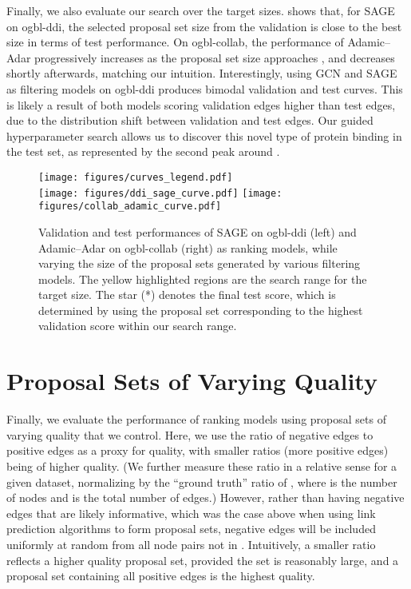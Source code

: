 \documentclass{article}
\begin{document}
Finally, we also evaluate our search over the target sizes.
 shows that, for SAGE on ogbl-ddi, the selected proposal set size from the validation is close to the best size in terms of test performance.
On ogbl-collab, the performance of Adamic--Adar progressively increases as the proposal set size approaches , and decreases shortly afterwards, matching our intuition. 
Interestingly, using GCN and SAGE as filtering models on ogbl-ddi produces bimodal validation and test curves. 
This is likely a result of both models scoring validation edges higher than test edges, 
due to the distribution shift between validation and test edges. 
Our guided hyperparameter search allows us to discover this novel type of protein binding in the test set, 
as represented by the second peak around .

\begin{figure}[t]
    \centering
    \texttt{[image: figures/curves\_legend.pdf]} \\
    \texttt{[image: figures/ddi\_sage\_curve.pdf]}
    \texttt{[image: figures/collab\_adamic\_curve.pdf]}
   \vspace{-0.5\baselineskip}
    \caption{Validation and test performances of SAGE on ogbl-ddi (left) and Adamic--Adar on ogbl-collab (right) as ranking models, while varying the size of the proposal sets generated by various filtering models. 
   The yellow highlighted regions are the search range for the target size.
    The star (*) denotes the final test score, which is determined by using the proposal set corresponding to the highest validation score within our search range.}
    \label{fig:curve}
\end{figure}



\section{Proposal Sets of Varying Quality}\label{ratioquality}

Finally, we evaluate the performance of ranking models using proposal sets of varying quality that we control.
Here, we use the ratio of negative edges to positive edges as a proxy for quality,
with smaller ratios (more positive edges) being of higher quality.
(We further measure these ratio in a relative sense for a given dataset, normalizing by the ``ground truth'' ratio of , where
 is the number of nodes and  is the total number of edges.)
However, rather than having negative edges that are likely informative, 
which was the case above when using link prediction algorithms to form proposal sets,
negative edges will be included uniformly at random from all node pairs not in .
Intuitively, a smaller ratio reflects a higher quality proposal set, provided the set is reasonably large,
and a proposal set containing all positive edges is the highest quality.
\end{document}
